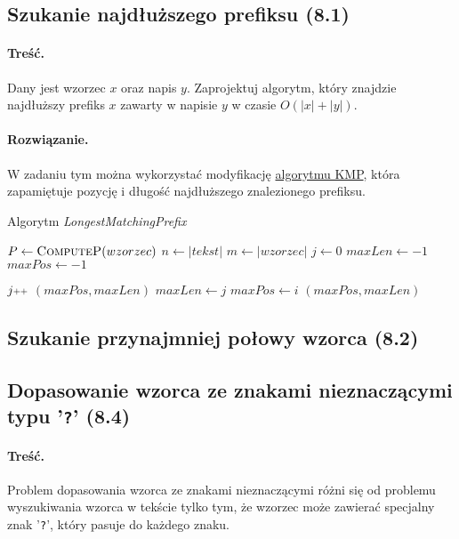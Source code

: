 \subsection{Szukanie najdłuższego prefiksu (8.1)}
\paragraph{Treść.}
Dany jest wzorzec $x$ oraz napis $y$. Zaprojektuj algorytm, który znajdzie najdłuższy prefiks $x$ zawarty w napisie $y$ w czasie $O(|x|+|y|)$.

\paragraph{Rozwiązanie.}
W zadaniu tym można wykorzystać modyfikację \hyperref[KMP]{algorytmu KMP}, która zapamiętuje pozycję i długość najdłuższego znalezionego prefiksu.

\begin{algorithm}[H]
	\caption{Algorytm \emph{LongestMatchingPrefix}}
	\begin{algorithmic}[1]
		\State $P \gets \textsc{ComputeP}(wzorzec)$
		\State $n \gets |tekst|$
		\State $m \gets |wzorzec|$
		\State $j \gets 0$
		\State $maxLen\gets-1$
		\State $maxPos\gets-1$ 
		
				\State $j\pp$
			\EndWhile
				\State\Return $(maxPos, maxLen)$
				\State $maxLen\gets j$
				\State $maxPos\gets i$
			\EndIf
		\EndFor
		\State\Return $(maxPos, maxLen)$
		\EndProcedure		
	\end{algorithmic}
\end{algorithm}

\subsection{Szukanie przynajmniej połowy wzorca (8.2)}

\subsection{Dopasowanie wzorca ze znakami nieznaczącymi typu '\texttt{?}' (8.4)}
\label{zadanie8.4}
\paragraph{Treść.}
Problem dopasowania wzorca ze znakami nieznaczącymi różni się od problemu wyszukiwania wzorca w tekście tylko tym, że wzorzec może zawierać specjalny znak '\texttt{?}', który pasuje do każdego znaku.

